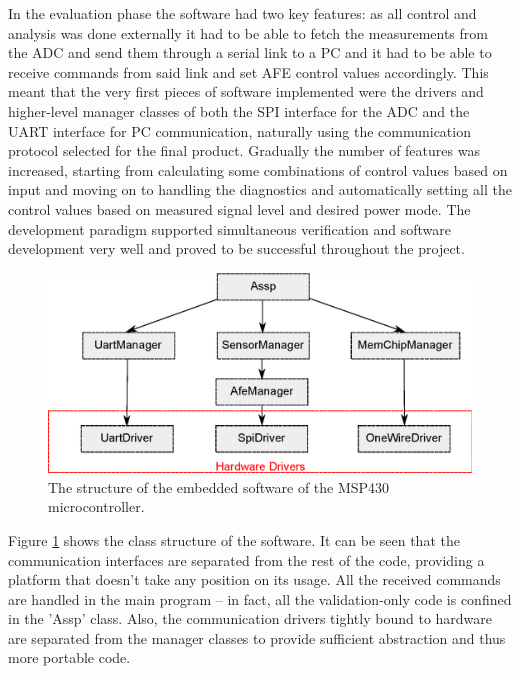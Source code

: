 In the evaluation phase the software had two key features: as all control and analysis was done externally it had to be able to fetch the measurements from the ADC and send them through a serial link to a PC and it had to be able to receive commands from said link and set AFE control values accordingly. This meant that the very first pieces of software implemented were the drivers and higher-level manager classes of both the SPI interface for the ADC and the UART interface for PC communication, naturally using the communication protocol selected for the final product. Gradually the number of features was increased, starting from calculating some combinations of control values based on input and moving on to handling the diagnostics and automatically setting all the control values based on measured signal level and desired power mode. The development paradigm supported simultaneous verification and software development very well and proved to be successful throughout the project.

\begin{figure}[htcb]
\begin{center}
\includegraphics[scale=0.75]{kuvat/assp_class_diagram.eps}
\caption{The structure of the embedded software of the MSP430 microcontroller.}
\label{fig:assp_class_diagram}
\end{center}
\end{figure}

Figure \ref{fig:assp_class_diagram} shows the class structure of the software. It can be seen that the communication interfaces are separated from the rest of the code, providing a platform that doesn't take any position on its usage. All the received commands are handled in the main program -- in fact, all the validation-only code is confined in the 'Assp' class. Also, the communication drivers tightly bound to hardware are separated from the manager classes to provide sufficient abstraction and thus more portable code.

